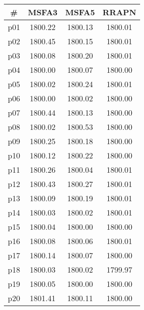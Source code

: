 \begin{tabular}{cccc}
\toprule
\textbf{\#} & \textbf{MSFA3} & \textbf{MSFA5} & \textbf{RRAPN}\\
\midrule
p01 & 1800.22 & 1800.13 & 1800.01\\
p02 & 1800.45 & 1800.15 & 1800.01\\
p03 & 1800.08 & 1800.20 & 1800.01\\
p04 & 1800.00 & 1800.07 & 1800.00\\
p05 & 1800.02 & 1800.24 & 1800.01\\
p06 & 1800.00 & 1800.02 & 1800.00\\
p07 & 1800.44 & 1800.13 & 1800.00\\
p08 & 1800.02 & 1800.53 & 1800.00\\
p09 & 1800.25 & 1800.18 & 1800.00\\
p10 & 1800.12 & 1800.22 & 1800.00\\
p11 & 1800.26 & 1800.04 & 1800.01\\
p12 & 1800.43 & 1800.27 & 1800.01\\
p13 & 1800.09 & 1800.19 & 1800.01\\
p14 & 1800.03 & 1800.02 & 1800.01\\
p15 & 1800.04 & 1800.00 & 1800.00\\
p16 & 1800.08 & 1800.06 & 1800.01\\
p17 & 1800.14 & 1800.07 & 1800.00\\
p18 & 1800.03 & 1800.02 & 1799.97\\
p19 & 1800.05 & 1800.00 & 1800.00\\
p20 & 1801.41 & 1800.11 & 1800.00\\
\bottomrule
\end{tabular}

